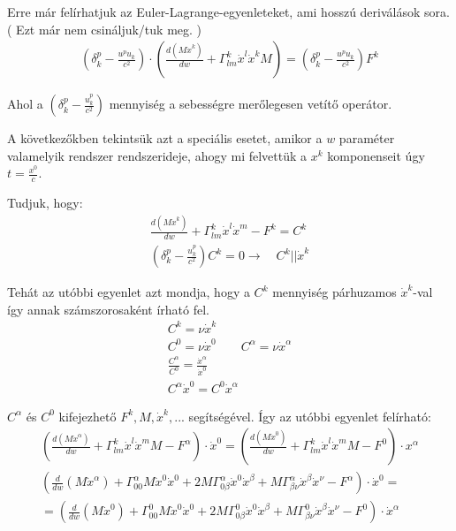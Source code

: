 \documentclass[a4paper,12pt]{article}
\begin{document}
\par Erre már felírhatjuk az Euler-Lagrange-egyenleteket, ami hosszú deriválások sora. ( Ezt már nem csináljuk/tuk meg. )
\begin{gather*}
    (\delta_{k}^{p} - \frac{u^{p}u_{k}}{c^{2}})\cdot(\frac{d(M\dot{x}^{k})}{dw} + \Gamma_{lm}^{k}\dot{x}^{l}\dot{x}^{k}M) = (\delta_{k}^{p} - \frac{u^{p}u_{k}}{c^{2}})F^{k}
\end{gather*}
\par Ahol a $(\delta_{k}^{p} - \frac{u^{p}_{k}}{c^{2}})$ mennyiség a sebességre merőlegesen vetítő operátor.
\par A következőkben tekintsük azt a speciális esetet, amikor a $w$ paraméter valamelyik rendszer rendszerideje, ahogy mi felvettük a $x^{k}$ komponenseit úgy $t = \frac{x^{0}}{c}$.
\par Tudjuk, hogy:
\begin{gather*}
    \frac{d(M\dot{x}^{k})}{dw} + \Gamma_{lm}^{k}\dot{x}^{l}\dot{x}^{m} - F^{k} = C^{k} \\
    (\delta_{k}^{p} - \frac{u^{p}_{k}}{c^{2}})C^{k} = 0 \rightarrow \quad C^{k} || \dot{x}^{k}
\end{gather*}
\par Tehát az utóbbi egyenlet azt mondja, hogy a $C^{k}$ mennyiség párhuzamos $\dot{x}^{k}$-val így annak számszorosaként írható fel. 
\begin{gather*}
    C^{k} = \nu \dot{x}^{k} \\
    C^{0} = \nu \dot{x}^{0} \quad \quad C^{\alpha} = \nu \dot{x}^{\alpha} \\
    \frac{C^{\alpha}}{C^{0}} = \frac{\dot{x}^{\alpha}}{\dot{x}^{0}} \\
    C^{\alpha}\dot{x}^{0} = C^{0}\dot{x}^{\alpha}
\end{gather*}
\par $C^{\alpha}$ és $C^{0}$ kifejezhető $F^{k}, M, \dot{x}^{k}, ...$ segítségével. Így az utóbbi egyenlet felírható:
\begin{align*}
    (\frac{d(M\dot{x}^{\alpha})}{dw} + \Gamma_{lm}^{k}\dot{x}^{l}\dot{x}^{m}M - F^{\alpha})\cdot \dot{x}^{0} = (\frac{d(M\dot{x}^{0})}{dw} + \Gamma_{lm}^{k}\dot{x}^{l}\dot{x}^{m}M - F^{0})\cdot x^{\alpha} \\
    (\frac{d}{dw}(M\dot{x}^{\alpha}) + \Gamma_{00}^{\alpha}M\dot{x}^{0}\dot{x}^{0} + 2M\Gamma_{0\beta}^{\alpha}\dot{x}^{0}\dot{x}^{\beta} + M\Gamma_{\beta\nu}^{\alpha}\dot{x}^{\beta}\dot{x}^{\nu} - F^{\alpha})\cdot \dot{x}^{0} = \\
    = (\frac{d}{dw}(M\dot{x}^{0}) + \Gamma_{00}^{0}M\dot{x}^{0}\dot{x}^{0} + 2M\Gamma_{0\beta}^{0}\dot{x}^{0}\dot{x}^{\beta} + M\Gamma_{\beta\nu}^{0}\dot{x}^{\beta}\dot{x}^{\nu} - F^{0})\cdot \dot{x}^{\alpha}
\end{align*}
\end{document}
